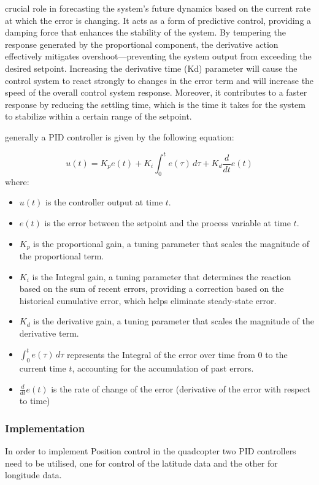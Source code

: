 \documentclass{report}
\begin{document}
\begin{itemize}
  crucial role in forecasting the system's future dynamics based on the current
  rate at which the error is changing. It acts as a form of predictive control,
  providing a damping force that enhances the stability of the system. By
  tempering the response generated by the proportional component, the derivative
  action effectively mitigates overshoot—preventing the system output from
  exceeding the desired setpoint. Increasing the derivative time (Kd) parameter
  will cause the control system to react strongly to changes in the error term
  and will increase the speed of the overall control system response. Moreover,
  it contributes to a faster response by reducing the settling time, which is
  the time it takes for the system to stabilize within a certain range of the
  setpoint.
\end{itemize}
generally a PID controller is given by the following equation: 

\begin{equation}
  u(t) = K_p e(t) + K_i \int_{0}^{t} e(\tau) \, d\tau + K_d \frac{d}{dt} e(t)
\end{equation}
where:
\begin{itemize}
    \item $u(t)$ is the controller output at time $t$.
    \item $e(t)$ is the error between the setpoint and the process variable at
    time $t$.
    \item $K_p$ is the proportional gain, a tuning parameter that scales the
    magnitude of the proportional term.
    \item $K_i$ is the Integral gain, a tuning parameter that determines the
    reaction based on the sum of recent errors, providing a correction based on
    the historical cumulative error, which helps eliminate steady-state error.
    \item $K_d$ is the derivative gain, a tuning parameter that scales the
    magnitude of the derivative term.
    \item $\int_{0}^{t} e(\tau) \, d\tau$ represents the Integral of the error
    over time from 0 to the current time $t$, accounting for the accumulation of
    past errors.
    \item $\frac{d}{dt} e(t)$ is the rate of change of the error (derivative of
    the error with respect to time)
\end{itemize}
\subsubsection*{Implementation}
In order to implement Position control in the quadcopter two PID controllers
need to be utilised, one for control of the latitude data and the other for
longitude data. 
\end{document}

